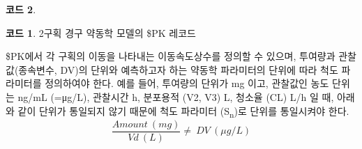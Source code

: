 \documentclass[
  10pt,
  krantz2,
  a4paper]{krantz}
\newenvironment{Shaded}{\begin{snugshade}}{\end{snugshade}}
\newcommand{\DecValTok}[1]{\textcolor[rgb]{0.00,0.00,0.81}{#1}}
\newcommand{\KeywordTok}[1]{\textcolor[rgb]{0.13,0.29,0.53}{\textbf{#1}}}
\newcommand{\NormalTok}[1]{#1}
\newcommand{\OperatorTok}[1]{\textcolor[rgb]{0.81,0.36,0.00}{\textbf{#1}}}
\newcommand{\StringTok}[1]{\textcolor[rgb]{0.31,0.60,0.02}{#1}}
\theoremstyle{definition}
\theoremstyle{definition}
\newtheorem{example}{코드}[chapter]
\theoremstyle{definition}
\theoremstyle{remark}
\begin{document}
\begin{Shaded}
\end{Shaded}

\begin{example}
\begin{example}

\protect\hypertarget{exm:two-comp-pk}{}{\label{exm:two-comp-pk} }2구획 경구 약동학 모델의 \$PK 레코드

\end{example}
\end{example}

\$PK에서 각 구획의 이동을 나타내는 이동속도상수를 정의할 수 있으며, 투여량과 관찰값(종속변수, DV)의 단위와 예측하고자 하는 약동학 파라미터의 단위에 따라 척도 파라미터를 정의하여야 한다. 예를 들어, 투여량의 단위가 mg 이고, 관찰값인 농도 단위는 ng/mL (=μg/L), 관찰시간 h, 분포용적 (V2, V3) L, 청소율 (CL) L/h 일 때, 아래와 같이 단위가 통일되지 않기 때문에 척도 파라미터 (S\textsubscript{n})로 단위를 통일시켜야 한다.
\begin{equation}
\frac{Amount\ (mg)}{Vd\ (L)} \neq \ DV\ (μg/L)
\label{eq:scalingparam}
\end{equation}
\end{document}

